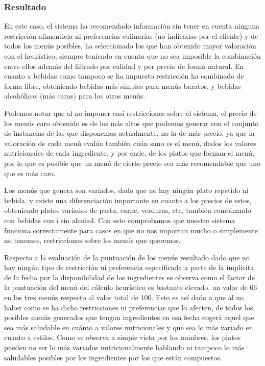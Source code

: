 \documentclass{article}
\begin{document}
\subsubsection{Resultado}
En este caso, el sistema ha recomendado información sin tener en cuenta ninguna restricción alimenticia ni preferencias culinarias (no indicadas por el cliente) y de todos los menús posibles, ha seleccionado los que han obtenido mayor valoración con el heurístico, siempre teniendo en cuenta que no sea imposible la combinación entre ellos además del filtrado por calidad y por precio de forma natural. En cuanto a bebidas como tampoco se ha impuesto restricción ha combinado de forma libre, obteniendo bebidas más simples para menús baratos, y bebidas alcohólicas (más caras) para los otros menús.
\par
Podemos notar que al no imponer casi restricciones sobre el sistema, el precio de los menús caro obtenido es de los más altos que podemos generar con el conjunto de instancias de las que disponemos actualmente, no la de más precio, ya que la valoración de cada menú evalúa también cuán sano es el menú, dados los valores nutricionales de cada ingrediente, y por ende, de los platos que forman el menú, por lo que es posible que un menú de cierto precio sea más recomendable que uno que es más caro.
\par
Los menús que genera son variados, dado que no hay ningún plato repetido ni bebida, y existe una diferenciación importante en cuanto a los precios de estos, obteniendo platos variados de pasta, carne, verduras, etc, también combinando con bebidas con i sin alcohol. Con esto comprobamos que nuestro sistema funciona correctamente para casos en que no nos importan mucho o simplemente no tenemos, restricciones sobre los menús que queremos.
\par
Respecto a la evaluación de la puntuación de los menús resultado dado que no hay ningún tipo de restricción ni preferencia especificada a parte de la implícita de la fecha por la disponibilidad de los ingredientes se observa como el factor de la puntuación del menú del cálculo heurístico es bastante elevado, un valor de 66 en los tres menús respecto al valor total de 100. Esto es así dado a que al no haber como se ha dicho restricciones ni preferencias que lo afecten, de todos los posibles menús generados que tengan ingredientes en esa fecha cogerá aquel que sea más saludable en cuánto a valores nutricionales y que sea lo más variado en cuanto a estilos. Como se observa a simple vista por los nombres, los platos pueden no ser lo más variados nutricionalmente hablando ni tampoco lo más saludables posibles por los ingredientes por los que están compuestos.
\end{document}
